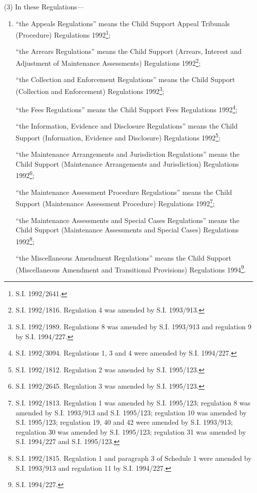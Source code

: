 \documentclass[a4paper]{article}
\begin{document}
(3) In these Regulations—
\begin{enumerate}\item[]
“the Appeals Regulations” means the Child Support Appeal Tribunals (Procedure) Regulations 1992\footnote{\frenchspacing S.I. 1992/2641.};

“the Arrears Regulations” means the Child Support (Arrears, Interest and Adjustment of Maintenance Assessments) Regulations 1992\footnote{\frenchspacing S.I. 1992/1816. Regulation 4 was amended by S.I. 1993/913.};

“the Collection and Enforcement Regulations” means the Child Support (Collection and Enforcement) Regulations 1992\footnote{\frenchspacing S.I. 1992/1989. Regulations 8 was amended by S.I. 1993/913 and regulation 9 by S.I. 1994/227.};

“the Fees Regulations” means the Child Support Fees Regulations 1992\footnote{\frenchspacing S.I. 1992/3094. Regulations 1, 3 and 4 were amended by S.I. 1994/227.};

“the Information, Evidence and Disclosure Regulations” means the Child Support (Information, Evidence and Disclosure) Regulations 1992\footnote{\frenchspacing S.I. 1992/1812. Regulation 2 was amended by S.I. 1995/123.};

“the Maintenance Arrangements and Jurisdiction Regulations” means the Child Support (Maintenance Arrangements and Jurisdiction) Regulations 1992\footnote{\frenchspacing S.I. 1992/2645. Regulation 3 was amended by S.I. 1995/123.};

“the Maintenance Assessment Procedure Regulations” means the Child Support (Maintenance Assessment Procedure) Regulations 1992\footnote{\frenchspacing S.I. 1992/1813. Regulation 1 was amended by S.I. 1995/123; regulation 8 was amended by S.I. 1993/913 and S.I. 1995/123; regulation 10 was amended by S.I. 1995/123; regulation 19, 40 and 42 were amended by S.I. 1993/913; regulation 30 was amended by S.I. 1995/123; regulation 31 was amended by S.I. 1994/227 and S.I. 1995/123.};

“the Maintenance Assessments and Special Cases Regulations” means the Child Support (Maintenance Assessments and Special Cases) Regulations 1992\footnote{\frenchspacing S.I. 1992/1815. Regulation 1 and paragraph 3 of Schedule 1 were amended by S.I. 1993/913 and regulation 11 by S.I. 1994/227.};

“the Miscellaneous Amendment Regulations” means the Child Support (Miscellaneous Amendment 
and Transitional Provisions) Regulations 1994\footnote{\frenchspacing S.I. 1994/227.}.
\end{enumerate}
\end{document}
